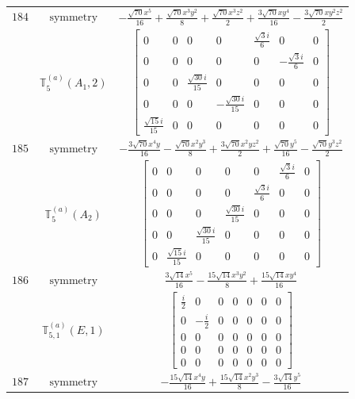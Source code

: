 \documentclass[fleqn,8pt,landscape]{jsarticle}
\begin{document}
\begin{longtable}{ccc}
$ 184 $ & $ \text{symmetry} $ & $ - \frac{\sqrt{70} x^{5}}{16} + \frac{\sqrt{70} x^{3} y^{2}}{8} + \frac{\sqrt{70} x^{3} z^{2}}{2} + \frac{3 \sqrt{70} x y^{4}}{16} - \frac{3 \sqrt{70} x y^{2} z^{2}}{2} $ \\
$  $ & $ \mathbb{T}_{5}^{(a)}(A_{1},2) $ & $ \begin{bmatrix} 0 & 0 & 0 & 0 & \frac{\sqrt{3} i}{6} & 0 & 0 \\ 0 & 0 & 0 & 0 & 0 & - \frac{\sqrt{3} i}{6} & 0 \\ 0 & 0 & \frac{\sqrt{30} i}{15} & 0 & 0 & 0 & 0 \\ 0 & 0 & 0 & - \frac{\sqrt{30} i}{15} & 0 & 0 & 0 \\ \frac{\sqrt{15} i}{15} & 0 & 0 & 0 & 0 & 0 & 0 \end{bmatrix} $ \\ \hline
$ 185 $ & $ \text{symmetry} $ & $ - \frac{3 \sqrt{70} x^{4} y}{16} - \frac{\sqrt{70} x^{2} y^{3}}{8} + \frac{3 \sqrt{70} x^{2} y z^{2}}{2} + \frac{\sqrt{70} y^{5}}{16} - \frac{\sqrt{70} y^{3} z^{2}}{2} $ \\
$  $ & $ \mathbb{T}_{5}^{(a)}(A_{2}) $ & $ \begin{bmatrix} 0 & 0 & 0 & 0 & 0 & \frac{\sqrt{3} i}{6} & 0 \\ 0 & 0 & 0 & 0 & \frac{\sqrt{3} i}{6} & 0 & 0 \\ 0 & 0 & 0 & \frac{\sqrt{30} i}{15} & 0 & 0 & 0 \\ 0 & 0 & \frac{\sqrt{30} i}{15} & 0 & 0 & 0 & 0 \\ 0 & \frac{\sqrt{15} i}{15} & 0 & 0 & 0 & 0 & 0 \end{bmatrix} $ \\ \hline
$ 186 $ & $ \text{symmetry} $ & $ \frac{3 \sqrt{14} x^{5}}{16} - \frac{15 \sqrt{14} x^{3} y^{2}}{8} + \frac{15 \sqrt{14} x y^{4}}{16} $ \\
$  $ & $ \mathbb{T}_{5,1}^{(a)}(E,1) $ & $ \begin{bmatrix} \frac{i}{2} & 0 & 0 & 0 & 0 & 0 & 0 \\ 0 & - \frac{i}{2} & 0 & 0 & 0 & 0 & 0 \\ 0 & 0 & 0 & 0 & 0 & 0 & 0 \\ 0 & 0 & 0 & 0 & 0 & 0 & 0 \\ 0 & 0 & 0 & 0 & 0 & 0 & 0 \end{bmatrix} $ \\ \hline
$ 187 $ & $ \text{symmetry} $ & $ - \frac{15 \sqrt{14} x^{4} y}{16} + \frac{15 \sqrt{14} x^{2} y^{3}}{8} - \frac{3 \sqrt{14} y^{5}}{16} $ \\

\end{longtable}
\end{document}
